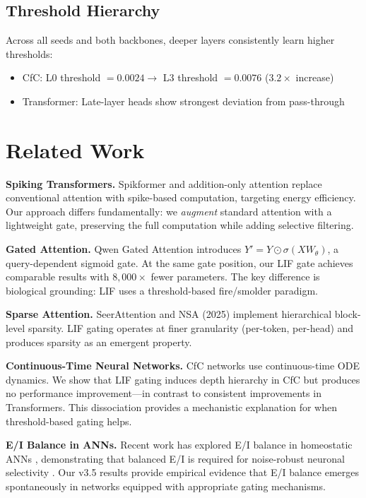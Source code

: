 \documentclass[11pt]{article}
\begin{document}
\subsection{Threshold Hierarchy}

Across all seeds and both backbones, deeper layers consistently learn higher thresholds:
\begin{itemize}
    \item CfC: L0 threshold $= 0.0024 \to$ L3 threshold $= 0.0076$ ($3.2\times$ increase)
    \item Transformer: Late-layer heads show strongest deviation from pass-through
\end{itemize}


\section{Related Work}

\textbf{Spiking Transformers.} Spikformer \cite{zhou2023spikformer} and addition-only attention replace conventional attention with spike-based computation, targeting energy efficiency. Our approach differs fundamentally: we \emph{augment} standard attention with a lightweight gate, preserving the full computation while adding selective filtering.

\textbf{Gated Attention.} Qwen Gated Attention \citep{yang2025qwen3} introduces $Y' = Y \odot \sigma(XW_\theta)$, a query-dependent sigmoid gate. At the same gate position, our LIF gate achieves comparable results with $8{,}000\times$ fewer parameters. The key difference is biological grounding: LIF uses a threshold-based fire/smolder paradigm.

\textbf{Sparse Attention.} SeerAttention and NSA (2025) implement hierarchical block-level sparsity. LIF gating operates at finer granularity (per-token, per-head) and produces sparsity as an emergent property.

\textbf{Continuous-Time Neural Networks.} CfC networks \cite{hasani2022closed} use continuous-time ODE dynamics. We show that LIF gating induces depth hierarchy in CfC but produces no performance improvement---in contrast to consistent improvements in Transformers. This dissociation provides a mechanistic explanation for when threshold-based gating helps.

\textbf{E/I Balance in ANNs.} Recent work has explored E/I balance in homeostatic ANNs \cite{mackwood2021ei}, demonstrating that balanced E/I is required for noise-robust neuronal selectivity \cite{rubin2017balanced}. Our v3.5 results provide empirical evidence that E/I balance emerges spontaneously in networks equipped with appropriate gating mechanisms.
\end{document}
